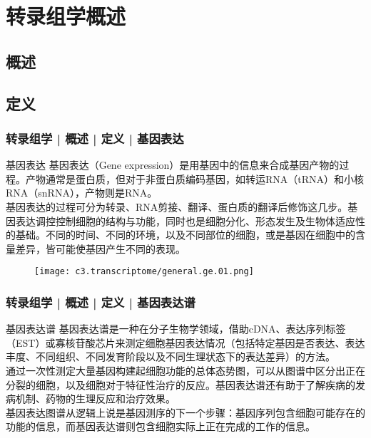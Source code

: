 \section{转录组学概述}
\subsection{概述}
\subsection{定义}
\begin{frame}
  \frametitle{转录组学 | 概述 | 定义 | 基因表达}
  \begin{block}{基因表达}
 基因表达（Gene expression）是用基因中的信息来合成基因产物的过程。产物通常是蛋白质，但对于非蛋白质编码基因，如转运RNA（tRNA）和小核RNA（snRNA），产物则是RNA。\\
 \vspace{0.5em}
基因表达的过程可分为转录、RNA剪接、翻译、蛋白质的翻译后修饰这几步。基因表达调控控制细胞的结构与功能，同时也是细胞分化、形态发生及生物体适应性的基础。不同的时间、不同的环境，以及不同部位的细胞，或是基因在细胞中的含量差异，皆可能使基因产生不同的表现。
  \end{block}
  \begin{figure}
    \centering
    \texttt{[image: c3.transcriptome/general.ge.01.png]}
  \end{figure}
\end{frame}

\begin{frame}
  \frametitle{转录组学 | 概述 | 定义 | 基因表达谱}
  \begin{block}{基因表达谱}
基因表达谱是一种在分子生物学领域，借助cDNA、表达序列标签（EST）或寡核苷酸芯片来测定细胞基因表达情况（包括特定基因是否表达、表达丰度、不同组织、不同发育阶段以及不同生理状态下的表达差异）的方法。\\
\vspace{1em}
通过一次性测定大量基因构建起细胞功能的总体态势图，可以从图谱中区分出正在分裂的细胞，以及细胞对于特征性治疗的反应。基因表达谱还有助于了解疾病的发病机制、药物的生理反应和治疗效果。\\
\vspace{1em}
基因表达图谱从逻辑上说是基因测序的下一个步骤：基因序列包含细胞可能存在的功能的信息，而基因表达谱则包含细胞实际上正在完成的工作的信息。
  \end{block}
\end{frame}

